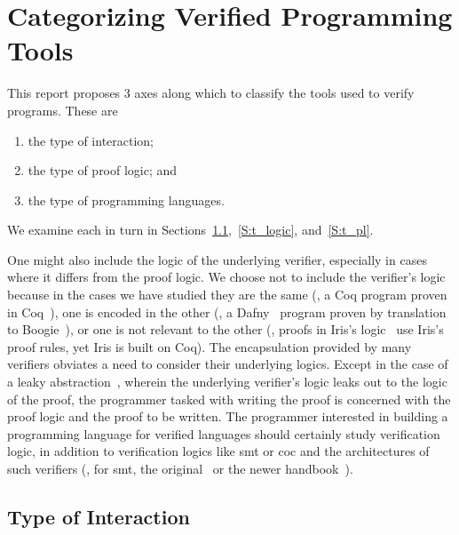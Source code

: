 \section{Categorizing Verified Programming Tools}\label{S:categories}

This report proposes 3 axes along which to classify the tools used to verify
programs. These are
\begin{enumerate}
    \item the type of interaction;
    \item the type of proof logic; and
    \item the type of programming languages.
\end{enumerate}

We examine each in turn in Sections~\ref{S:t_interaction},~\ref{S:t_logic},
and~\ref{S:t_pl}.

One might also include the logic of the underlying verifier, especially in cases
where it differs from the proof logic. We choose not to include the verifier's
logic because in the cases we have studied they are the same (\eg, a Coq program
proven in Coq~\cite{Coq}), one is encoded in the other (\eg, a
Dafny~\cite{leino2010dafny} program proven by translation to
Boogie~\cite{Barnett_2006,leino2008this}), or one is not relevant to the other
(\eg, proofs in Iris's logic~\cite{Jung_2018b} use Iris's proof rules, yet
Iris is built on Coq). The encapsulation provided by many verifiers obviates a
need to consider their underlying logics. Except in the case of a leaky
abstraction~\cite{Spolsky_2002}, wherein the underlying verifier's logic leaks
out to the logic of the proof, the programmer tasked with writing the proof is
concerned with the proof logic and the proof to be written. The
programmer interested in building a programming language for verified languages
should certainly study verification logic, in addition to verification logics
like \gls{smt} or \gls{coc} and the architectures of such verifiers (\eg, for
\gls{smt}, the original~\cite{Davis_1960,Davis_1962} or the newer
handbook~\cite{biere2009handbook}).

\subsection{Type of Interaction}\label{S:t_interaction}

